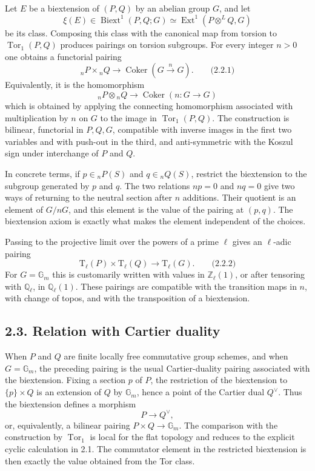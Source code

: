 \documentclass[11pt]{article}
\providecommand{\Tor}{\operatorname{Tor}}
\providecommand{\Ql}{\mathbb Q_\ell}
\providecommand{\Zl}{\mathbb Z_\ell}
\providecommand{\Gm}{\mathbb G_m}
\providecommand{\Ext}{\operatorname{Ext}}
\providecommand{\Tate}{\mathrm T}
\providecommand{\Biext}{\operatorname{Biext}}
\providecommand{\Ext}{\operatorname{Ext}}
\providecommand{\Tor}{\operatorname{Tor}}
\providecommand{\Coker}{\operatorname{Coker}}
\providecommand{\Gm}{\mathbb G_m}
\providecommand{\Ql}{\mathbb Q_\ell}
\providecommand{\Zl}{\mathbb Z_\ell}
\begin{document}
Let \(E\) be a biextension of \((P,Q)\) by an abelian group \(G\), and let
\[
        \xi(E)\in \Biext^1(P,Q;G)
        \simeq \Ext^1(P\otimes^L Q,G)
\]
be its class.  Composing this class with the canonical map from torsion to \(\Tor_1(P,Q)\) produces pairings on torsion subgroups.  For every integer \(n>0\) one obtains a functorial pairing
\[
        {}_nP\times {}_nQ\longrightarrow \Coker(G\xrightarrow{n}G).
\qquad\text{(2.2.1)}
\]
Equivalently, it is the homomorphism
\[
        {}_nP\otimes {}_nQ\longrightarrow \Coker(n:G\to G)
\]
which is obtained by applying the connecting homomorphism associated with multiplication by \(n\) on \(G\) to the image in \(\Tor_1(P,Q)\).  The construction is bilinear, functorial in \(P,Q,G\), compatible with inverse images in the first two variables and with push-out in the third, and anti-symmetric with the Koszul sign under interchange of \(P\) and \(Q\).

In concrete terms, if \(p\in {}_nP(S)\) and \(q\in {}_nQ(S)\), restrict the biextension to the subgroup generated by \(p\) and \(q\).  The two relations \(np=0\) and \(nq=0\) give two ways of returning to the neutral section after \(n\) additions.  Their quotient is an element of \(G/nG\), and this element is the value of the pairing at \((p,q)\).  The biextension axiom is exactly what makes the element independent of the choices.

Passing to the projective limit over the powers of a prime \(\ell\) gives an \(\ell\)-adic pairing
\[
        \Tate_\ell(P)\times \Tate_\ell(Q)
        \longrightarrow \Tate_\ell(G).
\qquad\text{(2.2.2)}
\]
For \(G=\Gm\) this is customarily written with values in \(\Zl(1)\), or after tensoring with \(\Ql\), in \(\Ql(1)\).  These pairings are compatible with the transition maps in \(n\), with change of topos, and with the transposition of a biextension.

\subsection*{2.3. Relation with Cartier duality}

When \(P\) and \(Q\) are finite locally free commutative group schemes, and when \(G=\Gm\), the preceding pairing is the usual Cartier-duality pairing associated with the biextension.  Fixing a section \(p\) of \(P\), the restriction of the biextension to \(\{p\}\times Q\) is an extension of \(Q\) by \(\Gm\), hence a point of the Cartier dual \(Q^\vee\).  Thus the biextension defines a morphism
\[
        P\longrightarrow Q^\vee,
\]
or, equivalently, a bilinear pairing \(P\times Q\to \Gm\).  The comparison with the construction by \(\Tor_1\) is local for the flat topology and reduces to the explicit cyclic calculation in 2.1.  The commutator element in the restricted biextension is then exactly the value obtained from the Tor class.
\end{document}
